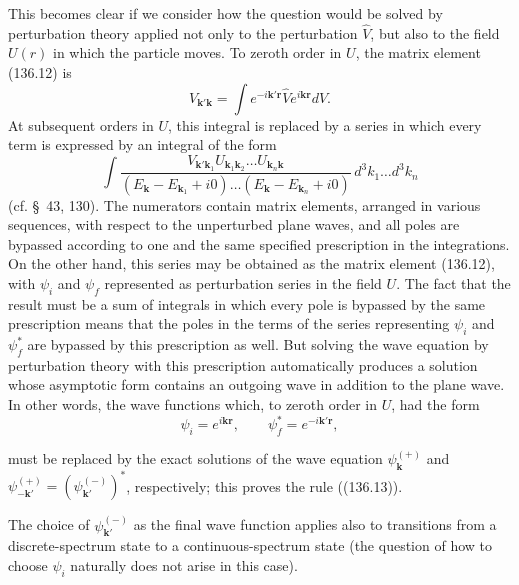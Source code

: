 This becomes clear if we consider how the question would be solved by perturbation theory applied not only to the perturbation $\hat V$, but also to the field $U(r)$ in which the particle moves. To zeroth order in $U$, the matrix element (136.12) is
\[
 V_{\mathbf k'\mathbf k}=\int e^{-i\mathbf{k'r}}\hat V e^{i\mathbf{kr}}dV.
\]
At subsequent orders in $U$, this integral is replaced by a series in which every term is expressed by an integral of the form
\[
 \int\frac{V_{\mathbf k'\mathbf k_1}U_{\mathbf k_1\mathbf k_2}\ldots U_{\mathbf k_n\mathbf k}}
 {(E_{\mathbf k}-E_{\mathbf k_1}+i0)\ldots(E_{\mathbf k}-E_{\mathbf k_n}+i0)}
 \,d^3k_1\ldots d^3k_n
\]
(cf. \S~43, 130). The numerators contain matrix elements, arranged in various sequences, with respect to the unperturbed plane waves, and all poles are bypassed according to one and the same specified prescription in the integrations. On the other hand, this series may be obtained as the matrix element (136.12), with $\psi_i$ and $\psi_f$ represented as perturbation series in the field $U$. The fact that the result must be a sum of integrals in which every pole is bypassed by the same prescription means that the poles in the terms of the series representing $\psi_i$ and $\psi_f^*$ are bypassed by this prescription as well. But solving the wave equation by perturbation theory with this prescription automatically produces a solution whose asymptotic form contains an outgoing wave in addition to the plane wave. In other words, the wave functions which, to zeroth order in $U$, had the form
\[
 \psi_i=e^{i\mathbf{kr}},\qquad\psi_f^*=e^{-i\mathbf{k'r}},
\]

must be replaced by the exact solutions of the wave equation $\psi_{\mathbf k}^{(+)}$ and $\psi_{-\mathbf k'}^{(+)}=(\psi_{\mathbf k'}^{(-)})^*$, respectively; this proves the rule ((136.13)).

The choice of $\psi_{\mathbf k'}^{(-)}$ as the final wave function applies also to transitions from a discrete-spectrum state to a continuous-spectrum state (the question of how to choose $\psi_i$ naturally does not arise in this case).
